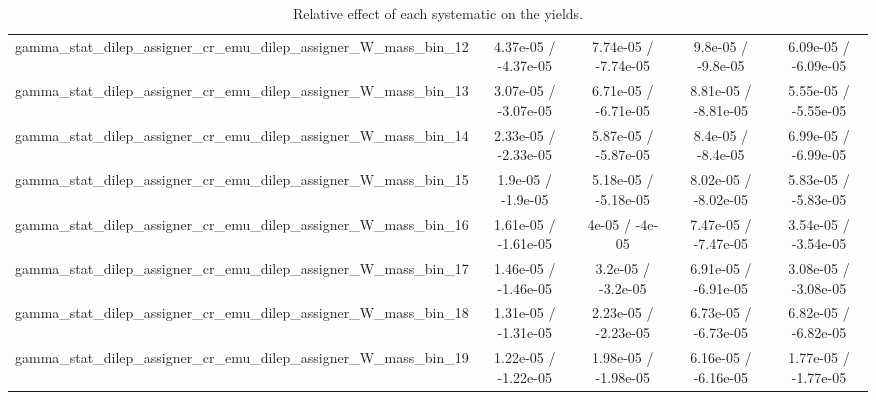 \documentclass[10pt]{article}
\begin{document}
\begin{table}[htbp]
\begin{center}
\begin{tabular}{|c|c|c|c|c|}
  gamma_stat_dilep_assigner_cr_emu_dilep_assigner_W_mass_bin_12 & 4.37e-05 / -4.37e-05 & 7.74e-05 / -7.74e-05 & 9.8e-05 / -9.8e-05 & 6.09e-05 / -6.09e-05 \\ 
  gamma_stat_dilep_assigner_cr_emu_dilep_assigner_W_mass_bin_13 & 3.07e-05 / -3.07e-05 & 6.71e-05 / -6.71e-05 & 8.81e-05 / -8.81e-05 & 5.55e-05 / -5.55e-05 \\ 
  gamma_stat_dilep_assigner_cr_emu_dilep_assigner_W_mass_bin_14 & 2.33e-05 / -2.33e-05 & 5.87e-05 / -5.87e-05 & 8.4e-05 / -8.4e-05 & 6.99e-05 / -6.99e-05 \\ 
  gamma_stat_dilep_assigner_cr_emu_dilep_assigner_W_mass_bin_15 & 1.9e-05 / -1.9e-05 & 5.18e-05 / -5.18e-05 & 8.02e-05 / -8.02e-05 & 5.83e-05 / -5.83e-05 \\ 
  gamma_stat_dilep_assigner_cr_emu_dilep_assigner_W_mass_bin_16 & 1.61e-05 / -1.61e-05 & 4e-05 / -4e-05 & 7.47e-05 / -7.47e-05 & 3.54e-05 / -3.54e-05 \\ 
  gamma_stat_dilep_assigner_cr_emu_dilep_assigner_W_mass_bin_17 & 1.46e-05 / -1.46e-05 & 3.2e-05 / -3.2e-05 & 6.91e-05 / -6.91e-05 & 3.08e-05 / -3.08e-05 \\ 
  gamma_stat_dilep_assigner_cr_emu_dilep_assigner_W_mass_bin_18 & 1.31e-05 / -1.31e-05 & 2.23e-05 / -2.23e-05 & 6.73e-05 / -6.73e-05 & 6.82e-05 / -6.82e-05 \\ 
  gamma_stat_dilep_assigner_cr_emu_dilep_assigner_W_mass_bin_19 & 1.22e-05 / -1.22e-05 & 1.98e-05 / -1.98e-05 & 6.16e-05 / -6.16e-05 & 1.77e-05 / -1.77e-05 \\ 
\hline 
\end{tabular} 
\caption{Relative effect of each systematic on the yields.} 
\end{center} 
\end{table} 
\end{document}
